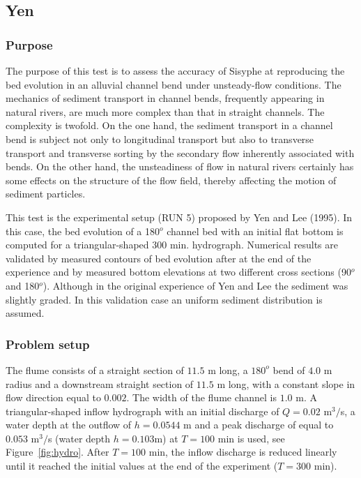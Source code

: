 \subsection{Yen}
%

%
\subsubsection{Purpose}
%
The purpose of this test is to assess the accuracy of Sisyphe at reproducing the bed evolution in an alluvial channel bend under 
unsteady-flow conditions. The mechanics of sediment transport in channel bends, frequently appearing in natural rivers, are much
 more complex than that in straight channels. The complexity is twofold. On the one hand, the sediment transport in a channel bend 
is subject not only to longitudinal transport but also to transverse transport and transverse sorting by the secondary flow 
inherently associated with bends. On the other hand, the unsteadiness of flow in natural rivers certainly has some effects on the 
structure of the flow field, thereby affecting the motion of sediment particles.

This test is the experimental setup (RUN 5) proposed by Yen and Lee (1995). In this case, the bed evolution of a 180$^o$ channel 
bed with an initial flat bottom is computed for a triangular-shaped $300$ min. hydrograph. Numerical results are validated by 
measured contours of bed evolution after at the end of the experience and by measured bottom elevations at
two different cross sections (90$^o$ and 180$^o$). Although in the original experience of Yen and Lee the sediment was slightly 
graded. In this validation case an uniform sediment distribution is assumed. 
%
\subsubsection{Problem setup}
%
The flume consists of a straight section of $11.5$ m
long, a $180^o$ bend of $4.0$ m radius and a downstream straight section of
$11.5$ m long, with a constant slope in flow direction equal to $0.002$. The width of the flume channel is $1.0$ m. A 
triangular-shaped inflow hydrograph with an initial discharge of $Q=0.02$ m$^3/$s, a water depth at the outflow of $h = 0.0544$ m 
and a peak discharge of equal to $0.053$ m$^3/$s (water depth $h=0.103$m) at $T = 100$ min
is used, see Figure~\ref{fig:hydro}. After $T = 100$ min, the inflow discharge is reduced linearly until it reached the 
initial values at the end of the experiment ($T = 300$ min).

